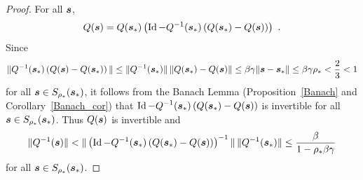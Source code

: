 \begin{proof}
For all $\bm{s}$,
\[
Q(\bm{s}) = Q(\bm{s}_\ast) \left( \operatorname{Id} - Q^{-1}(\bm{s}_\ast) \left(
Q(\bm{s}_\ast) - Q(\bm{s}) \right) \right) \ .
\]
Since
\[
\| Q^{-1}(\bm{s}_\ast) \left( Q(\bm{s}) - Q(\bm{s}_\ast)
\right) \| \leq \| Q^{-1}(\bm{s}_\ast) \| \,
\| Q(\bm{s}_\ast) - Q(\bm{s}) \|  \leq \beta\gamma
\| \bm{s} - \bm{s}_\ast \| \leq \beta\gamma\rho_\ast
< \frac{2}{3} < 1
\]
for all $\bm{s} \in S_{\rho_\ast}(\bm{s}_\ast)$, it follows from
the Banach Lemma (Proposition~\ref{Banach} and
Corollary~\ref{Banach_cor}) that
$\displaystyle \operatorname{Id} - Q^{-1}(\bm{s}_\ast) \left( Q(\bm{s}_\ast) -
Q(\bm{s}) \right)$ is invertible for all
$\bm{s} \in S_{\rho_\ast}(\bm{s}_\ast)$.  Thus $Q(\bm{s})$ is
invertible and
\[
\| Q^{-1}(\bm{s}) \| <
\| \left( \operatorname{Id} - Q^{-1}(\bm{s}_\ast) \left(
Q(\bm{s}_\ast) - Q(\bm{s}) \right) \right)^{-1} \| \,
\| Q^{-1}(\bm{s}_\ast) \| \leq
\frac{\beta}{1-\rho_\ast \beta\gamma}
\]
for all $\bm{s} \in S_{\rho_\ast}(\bm{s}_\ast)$.


\end{proof}
